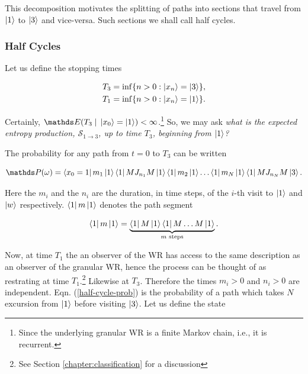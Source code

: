 This decomposition motivates the splitting of paths into sections that travel from $\ket{1}$ to $\ket{3}$ and vice-versa. Such sections we shall call half cycles.

\subsubsection{Half Cycles}
\label{subsection:half-cycles}

Let us define the stopping times

\begin{align}
    \begin{split}
  T_3 &= \inf\{n > 0: \ket{x_n} = \ket{3} \}, \\
  T_1 &= \inf\{ n > 0: \ket{x_n} = \ket{1} \}.
    \end{split}
\end{align}

Certainly, $\bE(T_3 \; | \; \ket{x_0} = \ket{1}) < \infty$.\footnote{Since the underlying granular WR is a finite Markov chain, i.e., it is recurrent.} So, we may ask \textit{what is the expected entropy production, $\mathcal{S}_{1 \rightarrow 3}$, up to time $T_3$, beginning from $\ket{1}$?}

The probability for any path from $t = 0$ to $T_3$ can be written

\begin{equation}\label{half-cycle-prob}
\bP(\omega) = \bra{x_0 = 1}m_1\ket{1}\bra{1}MJ_{n_1}M\ket{1}\bra{1}m_2\ket{1}\ldots\bra{1}m_N\ket{1}\bra{1}MJ_{n_N}M\ket{3}.
\end{equation}

Here the $m_i$ and the $n_i$ are the duration, in time steps, of the $i$-th visit to $\ket{1}$ and $\ket{w}$ respectively. $\bra{1}m\ket{1}$ denotes the path segment

\begin{equation}
    \bra{1}m\ket{1} = \underbrace{\bra{1}M\ket{1}\bra{1}M\ldots M\ket{1}}_{\text{$m$ steps}}.
\end{equation}

Now, at time $T_1$ the an observer of the WR has access to the same description as an observer of the granular WR, hence the process can be thought of as restrating at time $T_1$.\footnote{See Section \ref{chapter:classification} for a discussion} Likewise at $T_3$. Therefore the times $m_i > 0$ and $n_i > 0$ are independent. Eqn. (\ref{half-cycle-prob}) is the probability of a path which takes $N$ excursion from $\ket{1}$ before visiting $\ket{3}$. Let us define the state


